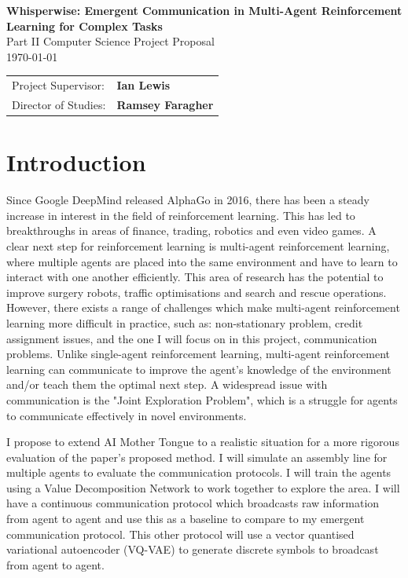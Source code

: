 \label{sec:proposal}

\begin{center}
  \Huge
  \textbf{Whisperwise: Emergent Communication in Multi-Agent Reinforcement Learning for Complex Tasks} \\[4mm]
  \Large
  Part II Computer Science Project Proposal \\[2mm]
  \today \\[8mm]
\end{center}

{\large
\begin{tabular}{ll}
  Project Supervisor:  & \bf Ian Lewis                \\
  Director of Studies: & \bf Ramsey Faragher                   \\
\end{tabular}
}



\section{Introduction}

\large
Since Google DeepMind released AlphaGo in 2016, there has been a steady increase in interest in the field of reinforcement learning. This has led to breakthroughs in areas of finance, trading, robotics and even video games. A clear next step for reinforcement learning is multi-agent reinforcement learning, where multiple agents are placed into the same environment and have to learn to interact with one another efficiently. This area of research has the potential to improve surgery robots, traffic optimisations and search and rescue operations. However, there exists a range of challenges which make multi-agent reinforcement learning more difficult in practice, such as: non-stationary problem, credit assignment issues, and the one I will focus on in this project, communication problems. Unlike single-agent reinforcement learning, multi-agent reinforcement learning can communicate to improve the agent's knowledge of the environment and/or teach them the optimal next step. A widespread issue with communication is the "Joint Exploration Problem", which is a struggle for agents to communicate effectively in novel environments.

I propose to extend AI Mother Tongue\cite{AIMotherTongue} to a realistic situation for a more rigorous evaluation of the paper's proposed method. I will simulate an assembly line for multiple agents to evaluate the communication protocols. I will train the agents using a Value Decomposition Network to work together to explore the area. I will have a continuous communication protocol which broadcasts raw information from agent to agent and use this as a baseline to compare to my emergent communication protocol. This other protocol will use a vector quantised variational autoencoder (VQ-VAE) to generate discrete symbols to broadcast from agent to agent.

